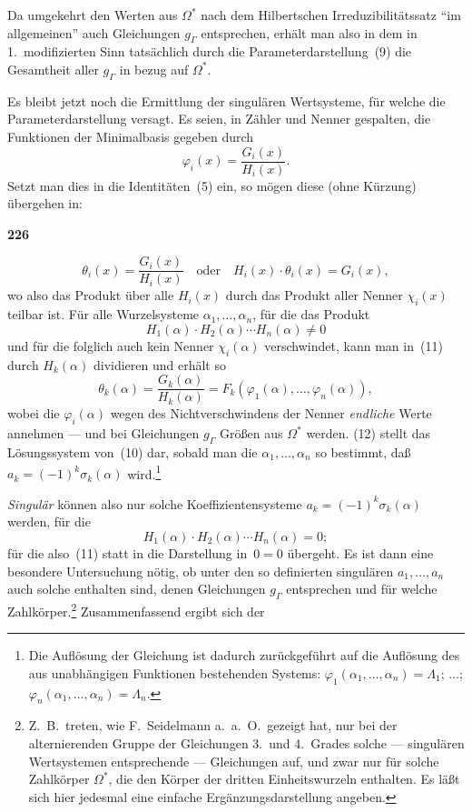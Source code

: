 \documentclass[12pt,a4paper]{article}
\begin{document}
Da umgekehrt den Werten aus $\Omega^*$ nach dem Hilbertschen Irreduzibilit\"atssatz ``im allgemeinen'' auch Gleichungen $g_{\Gamma}$ entsprechen, erh\"alt man also in dem in 1.\ modifizierten Sinn tats\"achlich durch die Parameterdarstellung~(9) die Gesamtheit aller $g_{\Gamma}$ in bezug auf $\Omega^*$.

Es bleibt jetzt noch die Ermittlung der singul\"aren Wertsysteme, f\"ur welche die Parameterdarstellung versagt. Es seien, in Z\"ahler und Nenner gespalten, die Funktionen der Minimalbasis gegeben durch
\[\varphi_i(x) = \frac{G_i(x)}{H_i(x)}.\]
Setzt man dies in die Identit\"aten~(5) ein, so m\"ogen diese (ohne K\"urzung) \"ubergehen in:

\newpage
\begin{center}
\textbf{226}
\end{center}

\begin{equation}\tag{11}
\theta_i(x) = \frac{G_i(x)}{H_i(x)} \quad \text{oder} \quad H_i(x) \cdot \theta_i(x) = G_i(x),
\end{equation}
wo also das Produkt \"uber alle $H_i(x)$ durch das Produkt aller Nenner $\chi_i(x)$ teilbar ist. F\"ur alle Wurzelsysteme $\alpha_1, \ldots, \alpha_n$, f\"ur die das Produkt
\[H_1(\alpha) \cdot H_2(\alpha) \cdots H_n(\alpha) \neq 0\]
und f\"ur die folglich auch kein Nenner $\chi_i(\alpha)$ verschwindet, kann man in~(11) durch $H_k(\alpha)$ dividieren und erh\"alt so
\begin{equation}\tag{12}
\theta_k(\alpha) = \frac{G_k(\alpha)}{H_k(\alpha)} = F_k(\varphi_1(\alpha), \ldots, \varphi_n(\alpha)),
\end{equation}
wobei die $\varphi_i(\alpha)$ wegen des Nichtverschwindens der Nenner \emph{endliche} Werte annehmen --- und bei Gleichungen $g_{\Gamma}$ Gr\"o\ss en aus $\Omega^*$ werden. (12) stellt das L\"osungssystem von~(10) dar, sobald man die $\alpha_1, \ldots, \alpha_n$ so bestimmt, da\ss{} $a_k = (-1)^k \sigma_k(\alpha)$ wird.\footnote{Die Aufl\"osung der Gleichung ist dadurch zur\"uckgef\"uhrt auf die Aufl\"osung des aus unabh\"angigen Funktionen bestehenden Systems: $\varphi_1(\alpha_1, \ldots, \alpha_n) = \Lambda_1$; $\ldots$; $\varphi_n(\alpha_1, \ldots, \alpha_n) = \Lambda_n$.}

\emph{Singul\"ar} k\"onnen also nur solche Koeffizientensysteme $a_k = (-1)^k \sigma_k(\alpha)$ werden, f\"ur die
\[H_1(\alpha) \cdot H_2(\alpha) \cdots H_n(\alpha) = 0;\]
f\"ur die also~(11) statt in die Darstellung in~$0 = 0$ \"ubergeht. Es ist dann eine besondere Untersuchung n\"otig, ob unter den so definierten singul\"aren $a_1, \ldots, a_n$ auch solche enthalten sind, denen Gleichungen $g_{\Gamma}$ entsprechen und f\"ur welche Zahlk\"orper.\footnote{Z.\ B.\ treten, wie F.\ Seidelmann a.\ a.\ O.\ gezeigt hat, nur bei der alternierenden Gruppe der Gleichungen 3.\ und 4.\ Grades solche --- singul\"aren Wertsystemen entsprechende --- Gleichungen auf, und zwar nur f\"ur solche Zahlk\"orper $\Omega^*$, die den K\"orper der dritten Einheitswurzeln enthalten. Es l\"a\ss t sich hier jedesmal eine einfache Erg\"anzungsdarstellung angeben.} Zusammenfassend ergibt sich der
\end{document}
